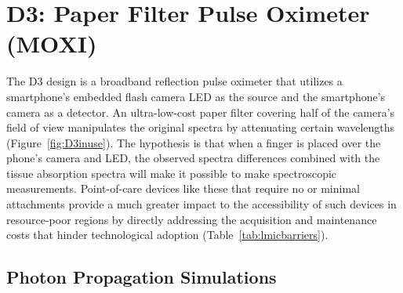 \section{D3: Paper Filter Pulse Oximeter (MOXI)}
The D3 design is a broadband reflection pulse oximeter that utilizes a smartphone's embedded flash camera LED as the source and the smartphone's camera as a detector. An ultra-low-cost paper filter covering half of the camera's field of view manipulates the original spectra by attenuating certain wavelengths (Figure~\ref{fig:D3inuse}). The hypothesis is that when a finger is placed over the phone's camera and LED, the observed spectra differences combined with the tissue absorption spectra will make it possible to make spectroscopic measurements. Point-of-care devices like these that require no or minimal attachments provide a much greater impact to the accessibility of such devices in resource-poor regions by directly addressing the acquisition and maintenance costs that hinder technological adoption (Table~\ref{tab:lmicbarriers}).

    \subsection{Photon Propagation Simulations}
